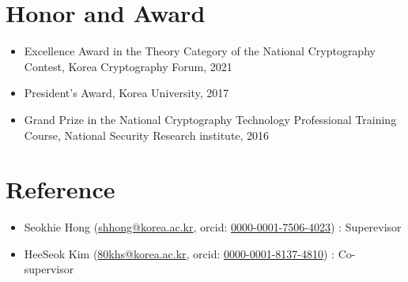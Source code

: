\documentclass[a4paper,20pt]{article}
\begin{document}
\section{\textbf{Honor and Award}}
\begin{itemize}
    \item {Excellence Award in the Theory Category of the National Cryptography Contest, Korea Cryptography Forum, 2021}
    \vspace{-4pt}
    \item {President's Award, Korea University, 2017}
    \vspace{-4pt}
    \item {Grand Prize in the National Cryptography Technology Professional Training Course, National Security Research institute, 2016}
\end{itemize}



\section{\textbf{Reference}}
\begin{itemize}
    \item {Seokhie Hong
           (\href{mailto:shhong@korea.ac.kr}{shhong@korea.ac.kr},
           orcid: \href{https://orcid.org/0000-0001-7506-4023}{0000-0001-7506-4023})
           : Superevisor}
    \vspace{-4pt}
    \item {HeeSeok Kim
           (\href{mailto:80khs@korea.ac.kr}{80khs@korea.ac.kr},
           orcid: \href{https://orcid.org/0000-0001-8137-4810}{0000-0001-8137-4810})
           : Co-supervisor}
\end{itemize}











\iffalse

\newcommand{\resumeItem}[2]{
  \item\small{
    \textbf{#1}{: #2 \vspace{-2pt}}
  }
}

\newcommand{\resumeItemWithoutTitle}[1]{
  \item\small{
    {\vspace{-2pt}}
  }
}

\newcommand{\resumeSubheading}[4]{
  \vspace{-1pt}\item
    \begin{tabular*}{0.97\textwidth}{l@{\extracolsep{\fill}}r}
      \textbf{#1} & #2 \\
      \textit{#3} & \textit{#4} \\
    \end{tabular*}\vspace{-5pt}
}
\end{document}
